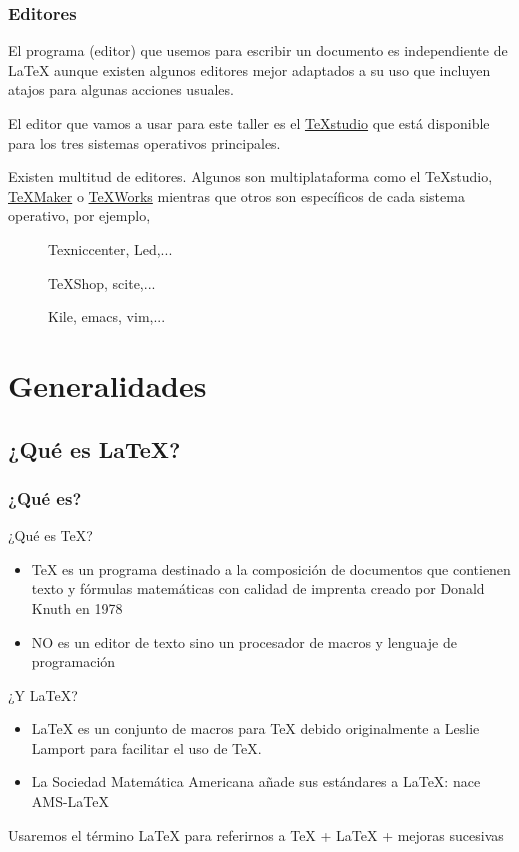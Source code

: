 \documentclass[10pt,xcolor=svgnames]{beamer}
\begin{document}
\begin{frame}
  \frametitle{Editores}

  El programa (editor) que usemos para escribir un documento es independiente de \LaTeX{} aunque existen algunos editores mejor adaptados a su uso que incluyen atajos para algunas acciones usuales.
  \medskip

  El editor que vamos a usar para este taller es el \href{https://www.texstudio.org/}{TeXstudio} que está disponible para los tres sistemas operativos principales.
  \medskip

  Existen multitud de editores. Algunos son multiplataforma como el TeXstudio, \href{https://www.xm1math.net/texmaker/}{TeXMaker} o \href{https://www.tug.org/texworks/}{TeXWorks} mientras que otros son específicos de cada sistema operativo, por ejemplo,
  \begin{description}
    \item[\faWindows] Texniccenter, Led,...
    \item[\faApple]  TeXShop,  scite,...
    \item[\faLinux] Kile, emacs, vim,...
  \end{description}
\end{frame}

\section{Generalidades}

\subsection{¿Qué es \LaTeX?}

\begin{frame}
  \frametitle{¿Qué es?}
  \begin{block}{¿Qué es \TeX?}
    \begin{itemize}
      \item \TeX{} es un programa destinado a la composición de documentos que contienen texto y fórmulas matemáticas con calidad de imprenta creado por Donald Knuth en 1978
      \item NO es un editor de texto sino un procesador de macros y lenguaje de programación
    \end{itemize}
  \end{block}
  \begin{block}{¿Y \LaTeX?}
    \begin{itemize}
      \item \LaTeX{} es un conjunto de macros para \TeX{}  debido originalmente a Leslie Lamport para facilitar el uso de \TeX.
      \item La Sociedad Matemática Americana añade sus estándares a \LaTeX{}: nace AMS-\LaTeX
    \end{itemize}
  \end{block}

  Usaremos el término \alert{\LaTeX{}} para referirnos a \TeX{} + \LaTeX{} + mejoras sucesivas
\end{frame}
\end{document}
